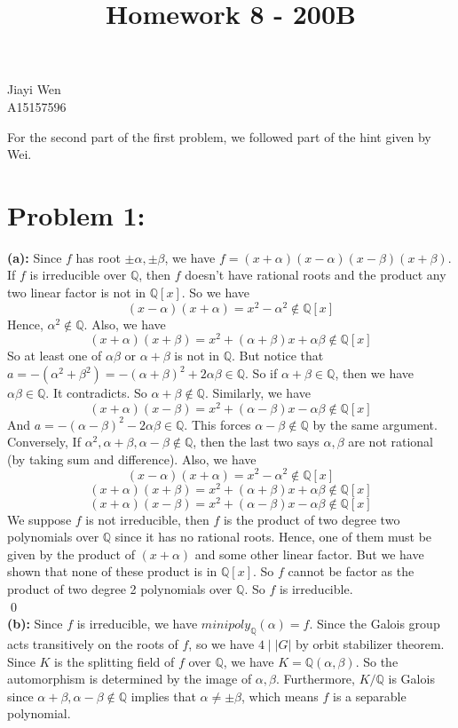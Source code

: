 \documentclass[12pt]{amsart}
\newcommand{\Q}{\mathbb{Q}}
\begin{document}
\title{Homework 8 - 200B}
\maketitle
\begin{center}
    Jiayi Wen\\
    A15157596
\end{center}
For the second part of the first problem, we followed part of the hint given by Wei.
\section*{Problem 1:}
\noindent\textbf{(a):} Since $f$ has root $\pm\alpha,\pm\beta$, we have $f=(x+\alpha)(x-\alpha)(x-\beta)(x+\beta)$. If $f$ is irreducible over $\Q$, then $f$ doesn't have rational roots and the product any two linear factor is not in $\Q[x]$. So we have 
\[(x-\alpha)(x+\alpha)=x^2-\alpha^2\notin \Q[x]\]
Hence, $\alpha^2\not\in \Q$. Also, we have
\[(x+\alpha)(x+\beta)=x^2+(\alpha+\beta)x+\alpha\beta\notin \Q[x]\]
So at least one of $\alpha\beta$ or $\alpha+\beta$ is not in $\Q$. But notice that $a=-(\alpha^2+\beta^2)=-(\alpha+\beta)^2+2\alpha\beta\in \Q$. So if $\alpha+\beta\in\Q$, then we have $\alpha\beta\in\Q$. It contradicts. So $\alpha+\beta\notin\Q$. Similarly, we have 
\[(x+\alpha)(x-\beta)=x^2+(\alpha-\beta)x-\alpha\beta\notin\Q[x]\]
And $a=-(\alpha-\beta)^2-2\alpha\beta\in\Q$. This forces $\alpha-\beta\notin\Q$ by the same argument.\\
Conversely,
If $\alpha^2,\alpha+\beta,\alpha-\beta\notin\Q$, then the last two says $\alpha,\beta$ are not rational (by taking sum and difference). Also, we have
\[(x-\alpha)(x+\alpha)=x^2-\alpha^2\notin \Q[x]\]
\[(x+\alpha)(x+\beta)=x^2+(\alpha+\beta)x+\alpha\beta\notin \Q[x]\]
\[(x+\alpha)(x-\beta)=x^2+(\alpha-\beta)x-\alpha\beta\notin\Q[x]\]
We suppose $f$ is not irreducible, then $f$ is the product of two degree two polynomials over $\Q$ since it has no rational roots. Hence, one of them must be given by the product of $(x+\alpha)$ and some other linear factor. But we have shown that none of these product is in $\Q[x]$. So $f$ cannot be factor as the product of two degree 2 polynomials over $\Q$. So $f$ is irreducible.\\\qed\\
\textbf{(b):} Since $f$ is irreducible, we have $minipoly_\Q(\alpha)=f$. Since the Galois group acts transitively on the roots of $f$, so we have $4\mid |G|$ by orbit stabilizer theorem. Since $K$ is the splitting field of $f$ over $\Q$, we have $K=\Q(\alpha,\beta)$. So the automorphism is determined by the image of $\alpha,\beta$. Furthermore, $K/\Q$ is Galois since $\alpha+\beta,\alpha-\beta\notin\Q$ implies that $\alpha\neq \pm\beta$, which means $f$ is a separable polynomial.  \\
\end{document}
